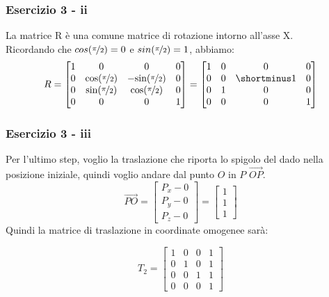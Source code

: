 \documentclass{beamer}
\begin{document}
\begin{frame}
\frametitle{Esercizio 3 - ii}
La matrice R \`e una comune matrice di rotazione intorno all'asse X. \\
Ricordando che $cos(\nicefrac{\pi}{2}) = 0$ e $sin(\nicefrac{\pi}{2}) = 1$, abbiamo:
\begin{displaymath}
R
= 
\begin{bmatrix}
    1 & 0 & 0 & 0 \\
    0 &\mbox{cos}(\nicefrac{\pi}{2}) & -\mbox{sin}(\nicefrac{\pi}{2}) & 0\\
    0 &\mbox{sin}(\nicefrac{\pi}{2}) & \mbox{cos}(\nicefrac{\pi}{2})  & 0\\ 
    0 & 0 & 0 & 1
\end{bmatrix}
= 
\begin{bmatrix}
    1 & 0 & 0 & 0 \\
    0 & 0 & \shortminus 1 & 0\\
    0 & 1 & 0 & 0\\ 
    0 & 0 & 0 & 1
\end{bmatrix}
\end{displaymath}
\end{frame}

\begin{frame}
\frametitle{Esercizio 3 - iii}
Per l'ultimo step, voglio la traslazione che riporta lo spigolo del dado nella posizione
iniziale, quindi voglio andare dal punto $O$ in $P$
$\overrightarrow{OP}$.
\begin{displaymath}
    \overrightarrow{PO}
    = 
\begin{bmatrix}
        P_x - 0\\
        P_y - 0\\
        P_z - 0
\end{bmatrix}
    = 
\begin{bmatrix}
        1\\
        1\\
        1
\end{bmatrix}
\end{displaymath}
Quindi la matrice di traslazione in coordinate omogenee sar\`a:

\begin{displaymath}
T_2 = 
\begin{bmatrix}
        1 & 0 & 0 & 1\\
        0 & 1 & 0 & 1\\
        0 & 0 & 1 & 1\\
        0 & 0 & 0 & 1 
\end{bmatrix}
\end{displaymath}
\end{frame}
\end{document}
